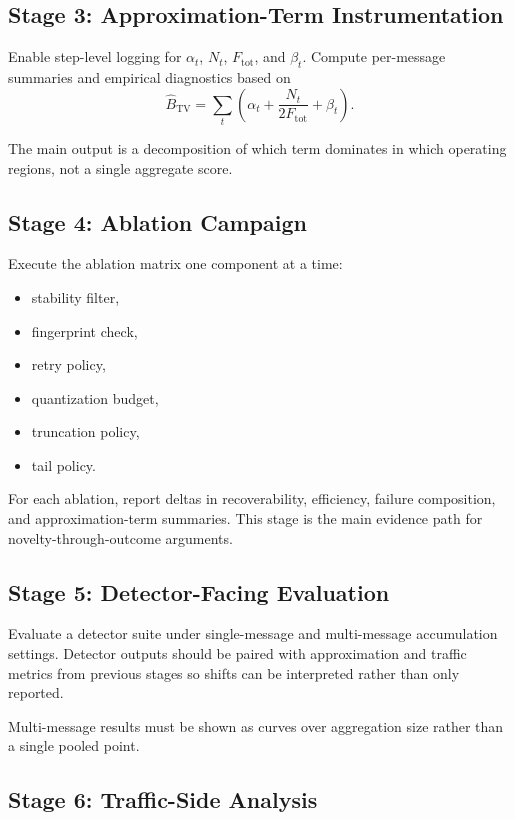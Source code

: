 \subsection{Stage 3: Approximation-Term Instrumentation}

Enable step-level logging for $\alpha_t$, $N_t$, $F_{\mathrm{tot}}$, and $\beta_t$.
Compute per-message summaries and empirical diagnostics based on
\begin{equation}
\widehat{B}_{\mathrm{TV}}=\sum_t\left(\alpha_t+\frac{N_t}{2F_{\mathrm{tot}}}+\beta_t\right).
\end{equation}

The main output is a decomposition of which term dominates in which operating regions, not a single aggregate score.

\subsection{Stage 4: Ablation Campaign}

Execute the ablation matrix one component at a time:
\begin{itemize}
\item stability filter,
\item fingerprint check,
\item retry policy,
\item quantization budget,
\item truncation policy,
\item tail policy.
\end{itemize}

For each ablation, report deltas in recoverability, efficiency, failure composition, and approximation-term summaries. This stage is the main evidence path for novelty-through-outcome arguments.

\subsection{Stage 5: Detector-Facing Evaluation}

Evaluate a detector suite under single-message and multi-message accumulation settings. Detector outputs should be paired with approximation and traffic metrics from previous stages so shifts can be interpreted rather than only reported.

Multi-message results must be shown as curves over aggregation size rather than a single pooled point.

\subsection{Stage 6: Traffic-Side Analysis}

